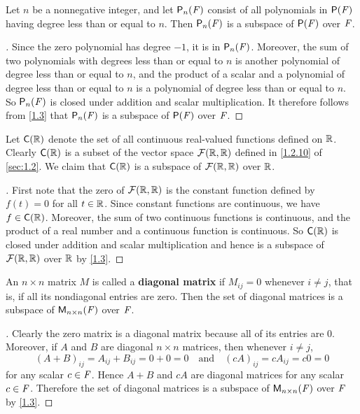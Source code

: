 \begin{eg}\label{1.3.6}
  Let \(n\) be a nonnegative integer, and let \(\ps[n]{\F}\) consist of all polynomials in \(\ps{\F}\) having degree less than or equal to \(n\).
  Then \(\ps[n]{\F}\) is a subspace of \(\ps{\F}\) over \(\mathit{F}\).
\end{eg}

\begin{proof}[]
  Since the zero polynomial has degree \(-1\), it is in \(\ps[n]{\F}\).
  Moreover, the sum of two polynomials with degrees less than or equal to \(n\) is another polynomial of degree less than or equal to \(n\), and the product of a scalar and a polynomial of degree less than or equal to \(n\) is a polynomial of degree less than or equal to \(n\).
  So \(\ps[n]{\F}\) is closed under addition and scalar multiplication.
  It therefore follows from \cref{1.3} that \(\ps[n]{\F}\) is a subspace of \(\ps{\F}\) over \(\mathit{F}\).
\end{proof}

\begin{eg}\label{1.3.7}
  Let \(\cfs(\R)\) denote the set of all continuous real-valued functions defined on \(\mathbb{R}\).
  Clearly \(\cfs(\R)\) is a subset of the vector space \(\mathcal{F}(\mathbb{R}, \mathbb{R})\) defined in \cref{1.2.10} of \cref{sec:1.2}.
  We claim that \(\cfs(\R)\) is a subspace of \(\mathcal{F}(\mathbb{R}, \mathbb{R})\) over \(\mathbb{R}\).
\end{eg}

\begin{proof}[]
  First note that the zero of \(\mathcal{F}(\mathbb{R}, \mathbb{R})\) is the constant function defined by \(f(t) = 0\) for all \(t \in \mathbb{R}\).
  Since constant functions are continuous, we have \(f \in \cfs(\R)\).
  Moreover, the sum of two continuous functions is continuous, and the product of a real number and a continuous function is continuous.
  So \(\cfs(\R)\) is closed under addition and scalar multiplication and hence is a subspace of \(\mathcal{F}(\mathbb{R}, \mathbb{R})\) over \(\mathbb{R}\) by \cref{1.3}.
\end{proof}

\begin{eg}\label{1.3.8}
  An \(n \times n\) matrix \(M\) is called a \textbf{diagonal matrix} if \(M_{i j} = 0\) whenever \(i \neq j\), that is, if all its nondiagonal entries are zero.
  Then the set of diagonal matrices is a subspace of \(\ms[n][n][\F]\) over \(\mathit{F}\).
\end{eg}

\begin{proof}[]
  Clearly the zero matrix is a diagonal matrix because all of its entries are \(0\).
  Moreover, if \(A\) and \(B\) are diagonal \(n \times n\) matrices, then whenever \(i \neq j\),
  \[
    (A + B)_{i j} = A_{i j} + B_{i j} = 0 + 0 = 0 \quad \text{and} \quad (cA)_{i j} = cA_{i j} = c0 = 0
  \]
  for any scalar \(c \in \mathit{F}\).
  Hence \(A + B\) and \(cA\) are diagonal matrices for any scalar \(c \in \mathit{F}\).
  Therefore the set of diagonal matrices is a subspace of \(\ms[n][n][\F]\) over \(\mathit{F}\) by \cref{1.3}.
\end{proof}

